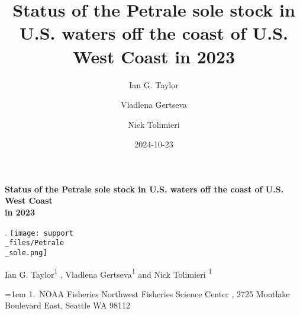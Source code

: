 \documentclass[
]{scrartcl}
\title{Status of the Petrale sole stock in U.S. waters off the coast of
U.S. West Coast in 2023}
\author{Ian G. Taylor \and Vladlena Gertseva \and Nick Tolimieri}
\date{2024-10-23}
\begin{document}
  \begin{titlepage}%
  \noindent  %
  \begin{minipage}[b][\textheight][s]{.975\textwidth}%
  \raggedright




  {\huge\bfseries\nohyphens{Status of the Petrale sole stock in U.S.
  waters off the coast of U.S. West Coast \\in 2023}\par}%


  \vspace{2\baselineskip}

{\centering. %
  \texttt{[image: support\\\_files/Petrale\\\_sole.png]}

  \vspace{1\baselineskip}

   {\large{Ian G. Taylor}}{\textsuperscript{1}}%
  ,
   {\large{Vladlena Gertseva}}{\textsuperscript{1}}%
  { and \large{Nick Tolimieri}}%
  {\textsuperscript{1}}%

}


  \vspace{2\baselineskip}

{\footnotesize %
  \hangindent=1em
  \relax
  {1}.~{NOAA Fisheries Northwest Fisheries Science Center}%
  , %
  2725 Montlake Boulevard East, Seattle WA 98112%

}
  \vspace{1\baselineskip}




\end{minipage}
\end{titlepage}
\end{document}

